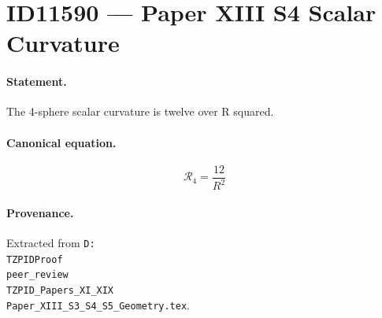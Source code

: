 \section*{ID11590 --- Paper XIII S4 Scalar Curvature}

\paragraph{Statement.}
The 4-sphere scalar curvature is twelve over R squared.

\paragraph{Canonical equation.}
\[
\mathcal{R}_4=\frac{12}{R^2}
\]

\paragraph{Provenance.}
Extracted from \texttt{D:\\TZPIDProof\\peer\_review\\TZPID\_Papers\_XI\_XIX\\Paper\_XIII\_S3\_S4\_S5\_Geometry.tex}.
